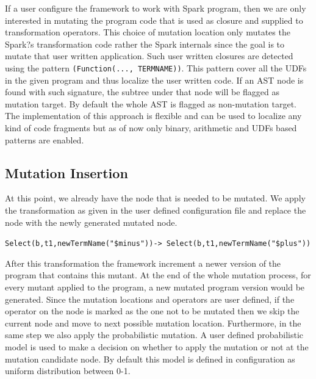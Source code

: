 If a user configure the framework to work with Spark program, then we are only interested in mutating the program code that is used as closure and supplied to transformation operators. This choice of mutation location only mutates the Spark?s transformation code rather the Spark internals since the goal is to mutate that user written application. Such user written closures are detected using the pattern  \texttt{(Function(..., TERMNAME))}. This pattern cover all the UDFs in the given program and thus localize the user written code. If an AST node is found with such signature, the subtree under that node will be flagged as mutation target. By default the whole AST is flagged as non-mutation target. The implementation of this approach is flexible and can be used to localize any kind of code fragments but as of now only binary, arithmetic and UDFs based patterns are enabled. 
\subsection{Mutation Insertion}
At this point, we already have the node that is needed to be mutated. We apply the transformation as given in the user defined configuration file and replace the node with the newly generated mutated node. 
\begin{center}
\texttt{Select(b,t1,newTermName("\$minus"))-> Select(b,t1,newTermName("\$plus"))}
\end{center}
After this transformation the framework increment a newer version of the program that contains this mutant. At the end of the whole mutation process, for every mutant applied to the program, a new mutated program version would be generated. Since the mutation locations and operators are user defined, if the operator on the node is marked as the one not to be mutated then we skip the current node and move to next possible mutation location. Furthermore, in the same step we also apply the probabilistic mutation. A user defined probabilistic model is used to make a decision on whether to apply the mutation or not at the mutation candidate node. By default this model is defined in configuration as uniform distribution between 0-1.
